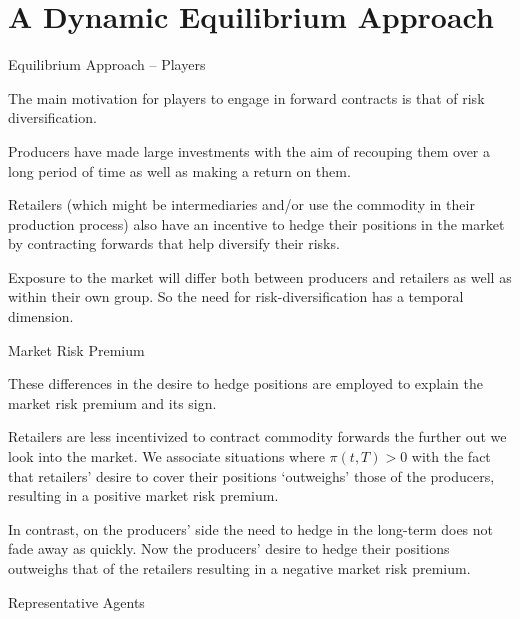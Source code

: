 \section{A Dynamic Equilibrium Approach}

{Equilibrium Approach -- Players}






The main
motivation for players to engage in forward contracts is that of
risk diversification.

Producers have made large investments with the
aim of recouping them over a long period of time as well as making a
return on them.

Retailers (which might be intermediaries and/or use the commodity in
their production process) also have an incentive to hedge their
positions in the market by contracting forwards that help diversify
their risks.

Exposure to the market will differ both between producers and
retailers as well as within their own group.
So the need for risk-diversification has a temporal dimension.






{Market Risk Premium}






	These differences in the
desire to hedge positions are employed to explain the market risk premium and
its sign.

	Retailers are less incentivized to contract commodity forwards
the further out we look into the market. We associate situations where
$\pi(t,T)>0$ with the fact that retailers' desire to cover their
positions `outweighs' those of the producers, resulting in a
positive market risk premium.

	In contrast, on the producers' side the need to hedge in the long-term
does not fade away as quickly. Now the producers' desire to hedge their positions outweighs that of the retailers resulting in a negative market risk premium.






{Representative Agents}



